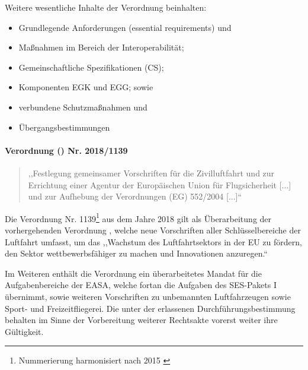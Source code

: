     \medskip
    Weitere wesentliche Inhalte der Verordnung beinhalten:

    \begin{itemize}
        \item Grundlegende Anforderungen (essential requirements) und
        \item Maßnahmen im Bereich der Interoperabilität;
        \item Gemeinschaftliche Spezifikationen (CS);
        \item Komponenten \ac{EGK} und \ac{EGG}; sowie
        \item verbundene Schutzmaßnahmen und
        \item Übergangsbestimmungen
    \end{itemize}

\paragraph{Verordnung () Nr. 2018/1139}
    \begin{quote}
        ,,Festlegung gemeinsamer Vorschriften für die Zivilluftfahrt und zur Errichtung einer Agentur der Europäischen Union für Flugsicherheit [...] und zur Aufhebung der Verordnungen (\acs{EG})  552/2004 [...]`` \cite{2018R1139} 
    \end{quote}

    \noindent
    Die Verordnung Nr. 1139\footnote{Nummerierung harmonisiert nach 2015 \cite{eu_number_harmony}} aus dem Jahre 2018 gilt als Überarbeitung der vorhergehenden Verordnung , welche neue Vorschriften aller Schlüsselbereiche der Luftfahrt umfasst, um das ,,Wachstum des Luftfahrtsektors in der \ac{EU} zu fördern, den Sektor wettbewerbsfähiger zu machen und Innovationen anzuregen.`` \cite{2018R1139_summary} 

    \medskip
    Im Weiteren enthält die Verordnung ein überarbeitetes Mandat für die Aufgabenbereiche der \acf{EASA}, welche fortan die Aufgaben des \ac{SES}-Pakets I übernimmt, sowie weiteren Vorschriften zu unbemannten Luftfahrzeugen sowie Sport- und Freizeitfliegerei.
    Die unter der  erlassenen Durchführungsbestimmung behalten im Sinne der Vorbereitung weiterer Rechtsakte vorerst weiter ihre Gültigkeit. \cite[ErwG. 83]{2018R1139}
    
